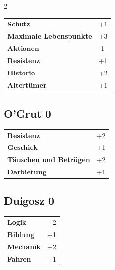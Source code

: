 \begin{multicols}{2}
\begin{tcolorbox}
\vspace{3mm}

\begin{tabular}{@{}ll@{}}
    \textbf{Schutz} & +1\\
    \textbf{Maximale Lebenspunkte} & +3\\
    \textbf{Aktionen} & -1\\
    \textbf{Resistenz} & +1\\
    \textbf{Historie} & +2\\
    \textbf{Altertümer} & +1\\
\end{tabular}


\end{tcolorbox}

\begin{tcolorbox}
    \subsection*{O'Grut \hfill \small{0 }}
    \tcblower




\begin{tabular}{@{}ll@{}}
    \textbf{Resistenz} & +2\\
    \textbf{Geschick} & +1\\
    \textbf{Täuschen und Betrügen} & +2\\
    \textbf{Darbietung} & +1\\
\end{tabular}


\end{tcolorbox}

\begin{tcolorbox}
    \subsection*{Duigosz \hfill \small{0 }}
    \tcblower




\begin{tabular}{@{}ll@{}}
    \textbf{Logik} & +2\\
    \textbf{Bildung} & +1\\
    \textbf{Mechanik} & +2\\
    \textbf{Fahren} & +1\\
\end{tabular}


\end{tcolorbox}
\end{multicols}
